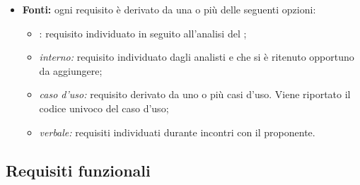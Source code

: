 \begin{itemize}
	\item \textbf{Fonti:} ogni requisito è derivato da una o più delle seguenti opzioni:
		\begin{itemize}
			\item {}: requisito individuato in seguito all'analisi del ;
			\item \textit{interno:} requisito individuato dagli analisti e che si è ritenuto opportuno da aggiungere;
			\item \textit{caso d'uso:} requisito derivato da uno o più casi d'uso. Viene riportato il codice univoco del caso d'uso;
			\item \textit{verbale:} requisiti individuati durante incontri con il proponente.
		\end{itemize}
\end{itemize}

\vspace{0.5cm}

\subsection{Requisiti funzionali}

